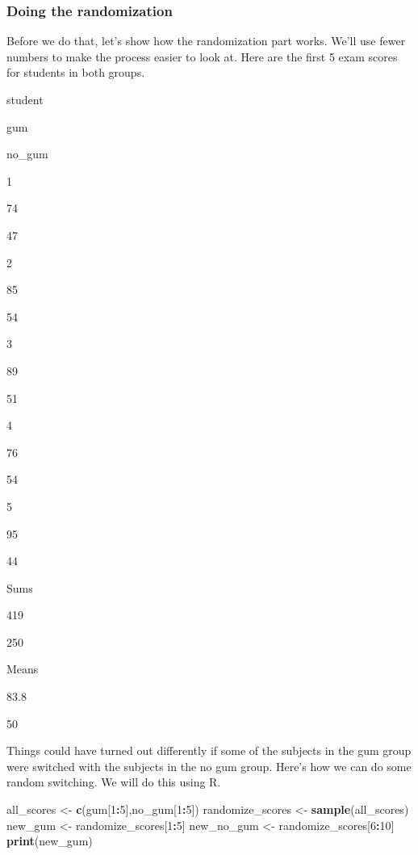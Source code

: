 \documentclass[]{book}
\newenvironment{Shaded}{\begin{snugshade}}{\end{snugshade}}
\newcommand{\DecValTok}[1]{\textcolor[rgb]{0.00,0.00,0.81}{#1}}
\newcommand{\KeywordTok}[1]{\textcolor[rgb]{0.13,0.29,0.53}{\textbf{#1}}}
\newcommand{\NormalTok}[1]{#1}
\newcommand{\OperatorTok}[1]{\textcolor[rgb]{0.81,0.36,0.00}{\textbf{#1}}}
\newcommand{\StringTok}[1]{\textcolor[rgb]{0.31,0.60,0.02}{#1}}
\begin{document}
\hypertarget{doing-the-randomization}{%
\subsubsection{Doing the randomization}\label{doing-the-randomization}}

Before we do that, let's show how the randomization part works. We'll use fewer numbers to make the process easier to look at. Here are the first 5 exam scores for students in both groups.

student

gum

no\_gum

1

74

47

2

85

54

3

89

51

4

76

54

5

95

44

Sums

419

250

Means

83.8

50

Things could have turned out differently if some of the subjects in the gum group were switched with the subjects in the no gum group. Here's how we can do some random switching. We will do this using R.

\begin{Shaded}
\begin{Highlighting}[]
\NormalTok{all_scores       <-}\StringTok{ }\KeywordTok{c}\NormalTok{(gum[}\DecValTok{1}\OperatorTok{:}\DecValTok{5}\NormalTok{],no_gum[}\DecValTok{1}\OperatorTok{:}\DecValTok{5}\NormalTok{])}
\NormalTok{randomize_scores <-}\StringTok{ }\KeywordTok{sample}\NormalTok{(all_scores)}
\NormalTok{new_gum          <-}\StringTok{ }\NormalTok{randomize_scores[}\DecValTok{1}\OperatorTok{:}\DecValTok{5}\NormalTok{]}
\NormalTok{new_no_gum       <-}\StringTok{ }\NormalTok{randomize_scores[}\DecValTok{6}\OperatorTok{:}\DecValTok{10}\NormalTok{]}
\KeywordTok{print}\NormalTok{(new_gum)}
\end{Highlighting}
\end{Shaded}
\end{document}
